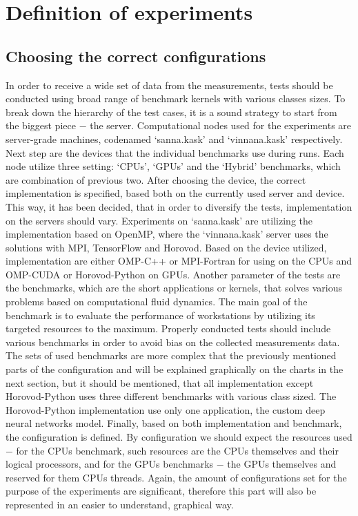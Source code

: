 \chapter{Definition of experiments}

\section{Choosing the correct configurations}

In order to receive a wide set of data from the measurements, tests should be
conducted using broad range of benchmark kernels with various classes sizes.
To break down the hierarchy of the test cases, it is a sound strategy to start
from the biggest piece $-$ the server. Computational nodes used for the 
experiments are server-grade machines, codenamed `sanna.kask' and
`vinnana.kask' respectively. Next step are the devices that the individual
benchmarks use during runs. Each node utilize three setting: `CPUs', `GPUs'
and the `Hybrid' benchmarks, which are combination of previous two. After
choosing the device, the correct implementation is specified, based both on
the currently used server and device. This way, it has been decided, that in
order to diversify the tests, implementation on the servers should vary.
Experiments on `sanna.kask' are utilizing the implementation based on OpenMP,
where the `vinnana.kask' server uses the solutions with MPI, TensorFlow and
Horovod. Based on the device utilized, implementation are either OMP-C++ or
MPI-Fortran for using on the CPUs and OMP-CUDA or Horovod-Python on GPUs.
Another parameter of the tests are the benchmarks, which are the short
applications or kernels, that solves various problems based on computational
fluid dynamics. The main goal of the benchmark is to evaluate the performance
of workstations by utilizing its targeted resources to the maximum. Properly
conducted tests should include various benchmarks in order to avoid bias on
the collected measurements data. The sets of used benchmarks are more complex
that the previously mentioned parts of the configuration and will be explained
graphically on the charts in the next section, but it should be mentioned, that
all implementation except Horovod-Python uses three different benchmarks with
various class sized. The Horovod-Python implementation use only one
application, the custom deep neural networks model. Finally, based on both
implementation and benchmark, the configuration is defined. By configuration
we should expect the resources used $-$ for the CPUs benchmark, such resources
are the CPUs themselves and their logical processors, and for the GPUs 
benchmarks $-$ the GPUs themselves and reserved for them CPUs threads. Again,
the amount of configurations set for the purpose of the experiments are
significant, therefore this part will also be represented in an easier to
understand, graphical way.

